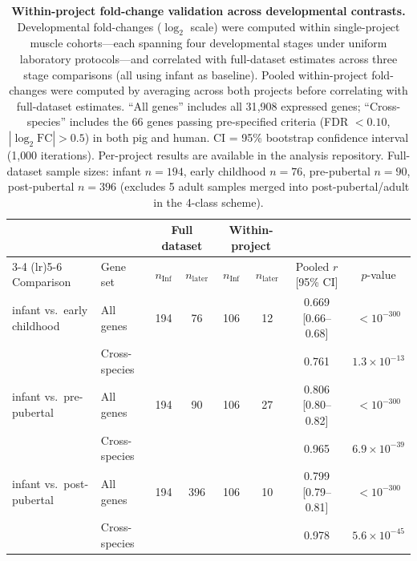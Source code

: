 \documentclass[10pt,a4paper]{article}
\begin{document}
\begin{table}[H]
  \centering
  \caption{\textbf{Within-project fold-change validation across developmental contrasts.} Developmental fold-changes ($\log_2$ scale) were computed within single-project muscle cohorts---each spanning four developmental stages under uniform laboratory protocols---and correlated with full-dataset estimates across three stage comparisons (all using infant as baseline). Pooled within-project fold-changes were computed by averaging across both projects before correlating with full-dataset estimates. ``All genes'' includes all 31{,}908 expressed genes; ``Cross-species'' includes the 66 genes passing pre-specified criteria (FDR $< 0.10$, $|\log_2\text{FC}| > 0.5$) in both pig and human. CI = 95\% bootstrap confidence interval (1{,}000 iterations). Per-project results are available in the analysis repository. Full-dataset sample sizes: infant $n = 194$, early childhood $n = 76$, pre-pubertal $n = 90$, post-pubertal $n = 396$ (excludes 5 adult samples merged into post-pubertal/adult in the 4-class scheme).}
  \label{tab:S5}
  \footnotesize
  \setlength{\tabcolsep}{4pt}
  \begin{tabular}{llcccccc}
    \toprule
    & & \multicolumn{2}{c}{Full dataset} & \multicolumn{2}{c}{Within-project} & & \\
    \cmidrule(lr){3-4} \cmidrule(lr){5-6}
    Comparison & Gene set & $n_{\text{Inf}}$ & $n_{\text{later}}$ & $n_{\text{Inf}}$ & $n_{\text{later}}$ & Pooled $r$ [95\% CI] & $p$-value \\
    \midrule
    infant vs.\ early childhood & All genes & 194 & 76 & 106 & 12 & 0.669 [0.66--0.68] & $< 10^{-300}$ \\
    & Cross-species & & & & & 0.761 & $1.3 \times 10^{-13}$ \\
    \midrule
    infant vs.\ pre-pubertal & All genes & 194 & 90 & 106 & 27 & 0.806 [0.80--0.82] & $< 10^{-300}$ \\
    & Cross-species & & & & & 0.965 & $6.9 \times 10^{-39}$ \\
    \midrule
    infant vs.\ post-pubertal & All genes & 194 & 396 & 106 & 10 & 0.799 [0.79--0.81] & $< 10^{-300}$ \\
    & Cross-species & & & & & 0.978 & $5.6 \times 10^{-45}$ \\
    \bottomrule
  \end{tabular}
\end{table}
\end{document}
